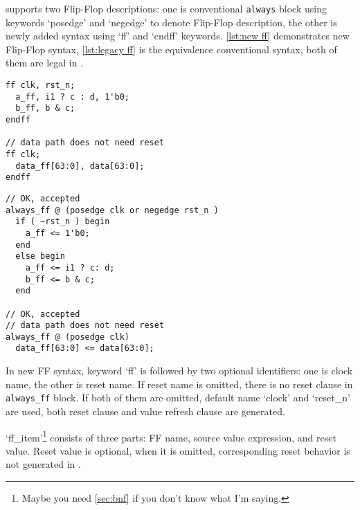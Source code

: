 \mhdl{} supports two Flip-Flop descriptions: 
one is conventional \texttt{always} 
block using keywords `posedge' and `negedge' to denote Flip-Flop
description, the other is newly added syntax using `ff' and `endff' keywords.
\autoref{lst:new ff} demonstrates new Flip-Flop syntax, 
\autoref{lst:legacy ff} is the equivalence conventional syntax, both of 
them are legal in \mhdlc{}. 

\begin{minipage}[t]{.45\textwidth}
\begin{lstlisting}[caption={\mhdl{} FF syntax}, label={lst:new ff}]
ff clk, rst_n;
  a_ff, i1 ? c : d, 1'b0;
  b_ff, b & c;
endff

// data path does not need reset
ff clk; 
  data_ff[63:0], data[63:0];
endff
\end{lstlisting}
\end{minipage}
\hspace{1ex}
\begin{minipage}[t]{.5\textwidth}
\begin{lstlisting}[caption={Legacy FF syntax},
label={lst:legacy ff}]
// OK, accepted
always_ff @ (posedge clk or negedge rst_n )
  if ( ~rst_n ) begin
    a_ff <= 1'b0;
  end
  else begin
    a_ff <= i1 ? c: d;
    b_ff <= b & c;
  end

// OK, accepted
// data path does not need reset
always_ff @ (posedge clk)
  data_ff[63:0] <= data[63:0];
\end{lstlisting}
\end{minipage}

In \mhdl{} new FF syntax, keyword `ff' is followed by two optional 
identifiers: one is clock name, the other is reset name. If reset
name is omitted, there is no reset clause in \texttt{always\_ff} 
block. If both of them are omitted, default name `clock' and `reset\_n' 
are used, both reset clause and value refresh clause are generated. 

`ff\_item'\footnote{Maybe you need \autoref{sec:bnf} if you don't know what I'm saying.} 
consists of three parts: FF name, source value expression, and
reset value. Reset value is optional, when it is omitted, corresponding reset behavior 
is not generated in \sv{}.


